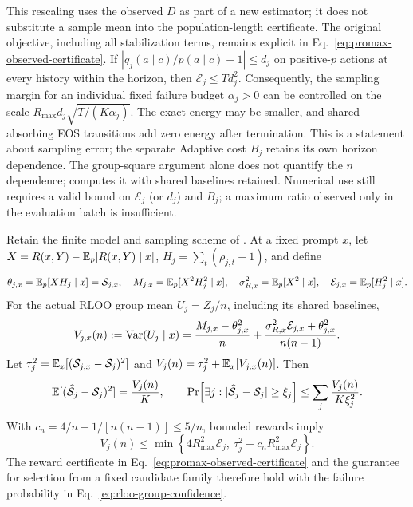 This rescaling uses the observed $D$ as part of a new estimator; it does not
substitute a sample mean into the population-length certificate. The
original objective, including all stabilization terms, remains explicit in
Eq.~\eqref{eq:promax-observed-certificate}. If
$|q_j(a\mid c)/p(a\mid c)-1|\le d_j$ on positive-$p$ actions at every
history within the horizon, then $\mathcal E_j\le Td_j^2$.
Consequently, the sampling margin for an individual fixed failure budget
$\alpha_j>0$ can be controlled on the scale
$R_{\max}d_j\sqrt{T/(K\alpha_j)}$.
The exact energy may be smaller, and shared absorbing EOS transitions add
zero energy after termination. This is a statement about sampling error;
the separate Adaptive cost $B_j$ retains its own horizon dependence.
The group-square argument alone does not quantify the $n$ dependence;
 computes it with shared baselines retained. Numerical use
still requires a valid bound on $\mathcal E_j$ (or $d_j$) and $B_j$;
a maximum ratio observed only in the evaluation batch is insufficient.

\begin{proposition}
\label{prop:rloo-group-variance}
Retain the finite model and sampling scheme of
. At a fixed prompt $x$, let
$X=R(x,Y)-\mathbb{E}_p[R(x,Y)\mid x]$, $H_j=\sum_t(\rho_{j,t}-1)$, and define
\begin{equation*}
    \theta_{j,x}=\mathbb{E}_p[XH_j\mid x]=\mathcal S_{j,x},\quad
    M_{j,x}=\mathbb{E}_p[X^2H_j^2\mid x],\quad
    \sigma_{R,x}^2=\mathbb{E}_p[X^2\mid x],\quad
    \mathcal E_{j,x}=\mathbb{E}_p[H_j^2\mid x].
\end{equation*}
For the actual RLOO group mean $U_j=Z_j/n$, including its shared baselines,
\begin{equation}
    V_{j,x}(n):=\mathrm{Var}(U_j\mid x)
    =\frac{M_{j,x}-\theta_{j,x}^2}{n}
      +\frac{\sigma_{R,x}^2\mathcal E_{j,x}+\theta_{j,x}^2}{n(n-1)}.
    \label{eq:rloo-group-variance}
\end{equation}
Let $\tau_j^2=\mathbb{E}_x[(\mathcal S_{j,x}-\mathcal S_j)^2]$ and
$V_j(n)=\tau_j^2+\mathbb{E}_x[V_{j,x}(n)]$. Then
\begin{equation}
    \mathbb{E}[(\widehat{\mathcal S}_j-\mathcal S_j)^2]=\frac{V_j(n)}{K},
    \qquad
    \Pr\!\left[\exists j:
       |\widehat{\mathcal S}_j-\mathcal S_j|\ge\xi_j\right]
       \le\sum_j\frac{V_j(n)}{K\xi_j^2}.
    \label{eq:rloo-group-confidence}
\end{equation}
With $c_n=4/n+1/[n(n-1)]\le5/n$, bounded rewards imply
\begin{equation}
    V_j(n)\le\min\!\left\{4R_{\max}^2\mathcal E_j,
                   \ \tau_j^2+c_nR_{\max}^2\mathcal E_j\right\}.
    \label{eq:rloo-group-energy-bound}
\end{equation}
The reward certificate in Eq.~\eqref{eq:promax-observed-certificate} and
the guarantee for selection from a fixed candidate family therefore hold
with the failure probability in Eq.~\eqref{eq:rloo-group-confidence}.
\end{proposition}

